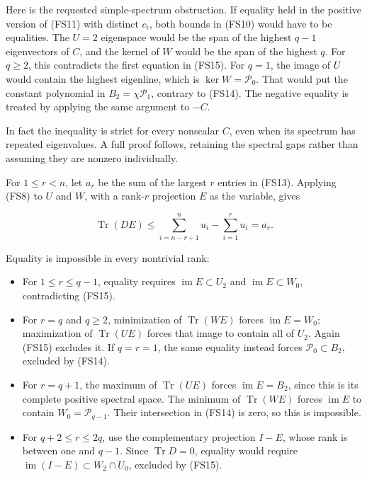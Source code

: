 \documentclass{article}
\begin{document}
Here is the requested simple-spectrum obstruction. If equality held in the positive version of (FS11) with distinct \(c_i\), both bounds in (FS10) would have to be equalities. The \(U=2\) eigenspace would be the span of the highest \(q-1\) eigenvectors of \(C\), and the kernel of \(W\) would be the span of the highest \(q\). For \(q\ge2\), this contradicts the first equation in (FS15). For \(q=1\), the image of \(U\) would contain the highest eigenline, which is \(\ker W=\mathcal P_0\). That would put the constant polynomial in \(B_2=\chi\mathcal P_1\), contrary to (FS14). The negative equality is treated by applying the same argument to \(-C\).

In fact the inequality is strict for every nonscalar \(C\), even when its spectrum has repeated eigenvalues. A full proof follows, retaining the spectral gaps rather than assuming they are nonzero individually.

For \(1\le r<n\), let \(a_r\) be the sum of the largest \(r\) entries in (FS13). Applying (FS8) to \(U\) and \(W\), with a rank-\(r\) projection \(E\) as the variable, gives

\[
\operatorname{Tr}(DE)
\le \sum_{i=n-r+1}^n u_i-\sum_{i=1}^r u_i=a_r.
\tag{FS16}
\]

Equality is impossible in every nontrivial rank:

\begin{itemize}
\tightlist
\item
  For \(1\le r\le q-1\), equality requires \(\operatorname{im}E\subset U_2\) and \(\operatorname{im}E\subset W_0\), contradicting (FS15).
\item
  For \(r=q\) and \(q\ge2\), minimization of \(\operatorname{Tr}(WE)\) forces \(\operatorname{im}E=W_0\); maximization of \(\operatorname{Tr}(UE)\) forces that image to contain all of \(U_2\). Again (FS15) excludes it. If \(q=r=1\), the same equality instead forces \(\mathcal P_0\subset B_2\), excluded by (FS14).
\item
  For \(r=q+1\), the maximum of \(\operatorname{Tr}(UE)\) forces \(\operatorname{im}E=B_2\), since this is its complete positive spectral space. The minimum of \(\operatorname{Tr}(WE)\) forces \(\operatorname{im}E\) to contain \(W_0=\mathcal P_{q-1}\). Their intersection in (FS14) is zero, so this is impossible.
\item
  For \(q+2\le r\le2q\), use the complementary projection \(I-E\), whose rank is between one and \(q-1\). Since \(\operatorname{Tr}D=0\), equality would require \(\operatorname{im}(I-E)\subset W_2\cap U_0\), excluded by (FS15).
\end{itemize}
\end{document}
